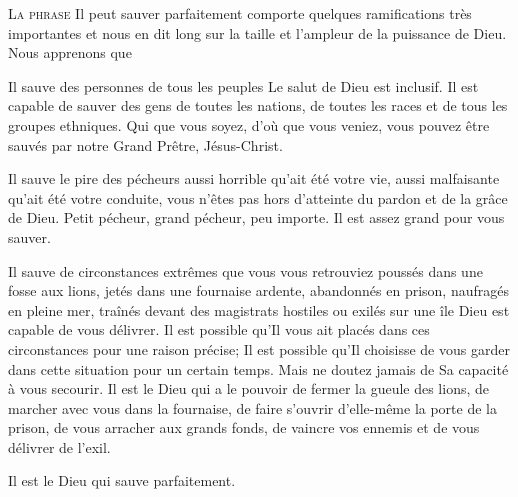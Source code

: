 

\lettrine{L}{a phrase\frcolon} 
 \Og Il peut sauver parfaitement \Fg{} comporte quelques ramifications
 très importantes et nous en dit long sur la taille et l'ampleur
 de la puissance de Dieu. Nous apprenons que\frcolon 

Il sauve des personnes de tous les peuples
 \ocadr Le salut de Dieu est inclusif.
 Il est capable de sauver des gens de toutes les nations,
 de toutes les races et de tous les groupes ethniques.
 Qui que vous soyez, d'où que vous veniez,
 vous pouvez être sauvés par notre Grand Prêtre, Jésus-Christ. 


Il sauve le pire des pécheurs \ocadr aussi horrible qu'ait été votre vie,
 aussi malfaisante qu'ait été votre conduite, vous n'êtes pas
 hors d'atteinte du pardon et de la grâce de Dieu.
 Petit pécheur, grand pécheur, peu importe.
 Il est assez grand pour vous sauver. 

Il sauve de circonstances extrêmes \ocadr que vous vous retrouviez poussés
 dans une fosse aux lions, jetés dans une fournaise ardente,
 abandonnés en prison, naufragés en pleine mer,
 traînés devant des magistrats hostiles ou exilés sur une île
 \ocadr Dieu est capable de vous délivrer.
 Il est possible qu'Il vous ait placés dans ces circonstances
 pour une raison précise; Il est possible qu'Il choisisse de vous garder
 dans cette situation pour un certain temps.
 Mais ne doutez jamais de Sa capacité à vous secourir.
 Il est le Dieu qui a le pouvoir de fermer la gueule des lions,
 de marcher avec vous dans la fournaise, de faire s'ouvrir d'elle-même
 la porte de la prison, de vous arracher aux grands fonds,
 de vaincre vos ennemis et de vous délivrer de l'exil. 

Il est le Dieu qui sauve parfaitement. 

\dvrule




